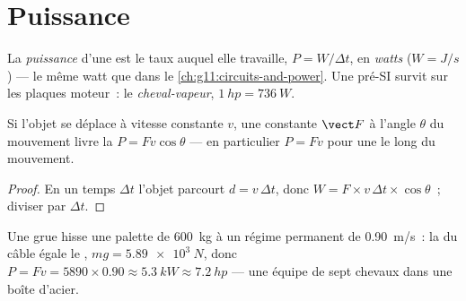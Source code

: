 \section{Puissance}

\begin{definition}[Puissance]\label{def:g11:work-of-force:power}
La \emph{puissance} d'une
 est le taux auquel elle
travaille, $P = W/\Delta t$, en
\emph{watts} ($\unit{W} = \unit{J/s}$) --- le même watt que
dans le \cref{ch:g11:circuits-and-power}. Une
 pré-SI survit sur les plaques
moteur~: le \emph{cheval-vapeur},
$\qty{1}{hp} = \qty{736}{W}$.
\end{definition}

\begin{proposition}\label{prop:g11:work-of-force:pfv}
Si l'objet se déplace à vitesse constante $v$, une
 constante $\vect F$ à l'angle $\theta$
du mouvement livre la 
$P = F v \cos\theta$ --- en particulier $P = Fv$ pour une
 le long du mouvement.
\end{proposition}

\begin{proof}
En un temps $\Delta t$ l'objet parcourt $d = v\,\Delta t$, donc
$W = F \times v\,\Delta t \times \cos\theta$~; diviser par $\Delta t$.
\end{proof}

\begin{example}[Grue]\label{ex:g11:work-of-force:crane}
Une grue hisse une palette de \qty{600}{kg} à un régime permanent de
\qty{0.90}{m/s}~: la  du câble égale le
, $mg = \qty{5.89e3}{N}$, donc
$P = Fv = 5890 \times 0.90 \approx \qty{5.3}{kW} \approx \qty{7.2}{hp}$
--- une équipe de sept chevaux dans une boîte d'acier.
\end{example}

